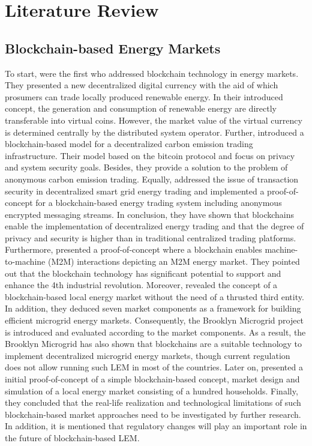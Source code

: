 \section{Literature Review}
\label{sec:literature_review}

\subsection{Blockchain-based Energy Markets}
\label{sec:Blockchain-based Energy Markets}
To start,  were the first who addressed blockchain technology in
energy markets. They presented a new decentralized digital currency with the aid of
which prosumers can trade locally produced renewable energy.
In their introduced concept, the generation and consumption of renewable energy are directly
transferable into virtual coins. However, the market value of the virtual currency is determined
centrally by the distributed system operator. Further,  introduced a blockchain-based
model for a decentralized carbon emission trading infrastructure.
Their model based on the bitcoin protocol and focus on privacy and system security goals.
Besides, they provide a solution to the problem of anonymous carbon emission trading.
Equally,  addressed the issue of transaction security in
decentralized smart grid energy trading and implemented a proof-of-concept for a
blockchain-based energy trading system including anonymous encrypted messaging streams.
In conclusion, they have shown that blockchains enable the implementation of decentralized energy trading and that the degree
of privacy and security is higher than in traditional centralized trading platforms.
Furthermore, 
presented a proof-of-concept where a blockchain enables machine-to-machine (M2M) interactions depicting an
M2M energy market. They pointed out that the blockchain technology has
significant potential to support and enhance the 4th industrial revolution. 
Moreover, 
revealed the concept of a blockchain-based local energy market without the need of a thrusted
third entity. In addition, they deduced seven market
components as a framework for building efficient microgrid energy markets. Consequently,
the Brooklyn Microgrid project is introduced and evaluated according to the market components.
As a result, the Brooklyn Microgrid has also shown that blockchains are a suitable technology
to implement decentralized microgrid energy markets, though current regulation does not
allow running such LEM in most of the countries. Later on, 
presented a initial proof-of-concept of a simple blockchain-based concept, market design and
simulation of a local energy market consisting of a hundred households.
Finally, they concluded that the real-life realization and technological limitations of such blockchain-based
market approaches need to be investigated by further research. 
In addition, it is mentioned that regulatory
changes will play an important role in the future of blockchain-based LEM.

